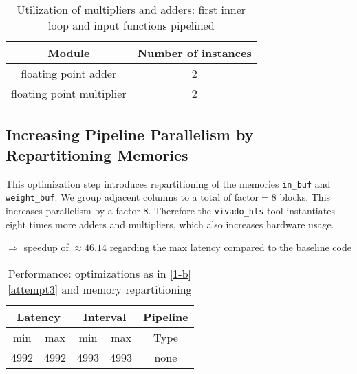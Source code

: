 \documentclass[../main.tex]{subfiles}
\begin{document}
\begin{enumerate}
	\begin{table}[H]
		\centering
		\begin{tabular}{cc}
			Module & Number of instances \\
			\hline
			floating point adder & 2 \\
			floating point multiplier & 2
		\end{tabular}
		\caption{Utilization of multipliers and adders: first inner loop and input functions pipelined}
		\label{1-b-resources-arithmetic-3}
	\end{table}

\end{enumerate}

\subsection{Increasing Pipeline Parallelism by Repartitioning Memories}
\label{1-c}
This optimization step introduces repartitioning of the memories \texttt{in\_buf} and \texttt{weight\_buf}. We group adjacent columns to a total of factor$=8$ blocks. This increases parallelism by a factor 8. Therefore the \texttt{vivado\_hls} tool instantiates eight times more adders and multipliers, which also increases hardware usage. 

$\Rightarrow$ speedup of $\approx 46.14 $ regarding the max latency compared to the baseline code
	\begin{table}[H]
		\centering
		\begin{tabular}{ccccc}
			\multicolumn{2}{c}{Latency} & \multicolumn{2}{c}{Interval} & Pipeline\\
			\hline
			min  &   max  &   min  &   max  &   Type  \\
			4992&  4992&  4993&  4993&   none 
		\end{tabular}
		\caption{Performance:  optimizations as in \ref{1-b} \ref{attempt3} and memory repartitioning}
		\label{1-c-perf-table}
	\end{table}
\end{document}
